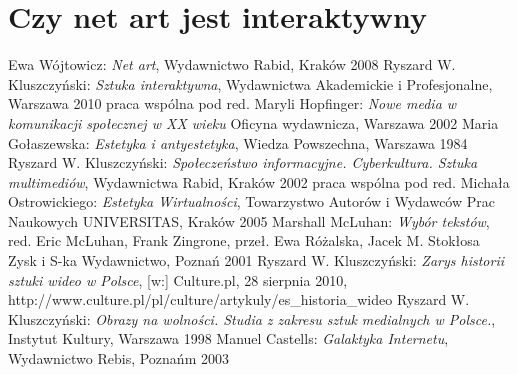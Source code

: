 \documentclass[a4paper,12pt,twoside]{article}
\begin{document}
\section{Czy net art jest interaktywny}


\begin{thebibliography}{6}
  Ewa Wójtowicz:
  \textit{Net art},
  Wydawnictwo Rabid, Kraków 2008
  Ryszard W. Kluszczyński:
  \textit{Sztuka interaktywna},
  Wydawnictwa Akademickie i Profesjonalne,
  Warszawa 2010
  praca wspólna pod red. Maryli Hopfinger:
  \textit{Nowe media w komunikacji społecznej w XX wieku}
  Oficyna wydawnicza,
  Warszawa 2002
  Maria Gołaszewska:
  \textit{Estetyka i antyestetyka},
  Wiedza Powszechna, Warszawa 1984
  Ryszard W. Kluszczyński:
  \textit{Społeczeństwo informacyjne. Cyberkultura. Sztuka multimediów},
  Wydawnictwa Rabid, Kraków 2002
  praca wspólna pod red. Michała Ostrowickiego:
  \textit{Estetyka Wirtualności},
  Towarzystwo Autorów i Wydawców Prac Naukowych UNIVERSITAS,
  Kraków 2005
  Marshall McLuhan:
  \textit{Wybór tekstów},
  red. Eric McLuhan, Frank Zingrone,
  przeł. Ewa Różalska, Jacek M. Stokłosa
  Zysk i S-ka Wydawnictwo, Poznań 2001
  Ryszard W. Kluszczyński:
  \textit{Zarys historii sztuki wideo w Polsce},
  [w:] Culture.pl, 28 sierpnia 2010,
  http://www.culture.pl/pl/culture/artykuly/es\_historia\_wideo
  Ryszard W. Kluszczyński:
  \textit{Obrazy na wolności. Studia z zakresu sztuk medialnych w Polsce.},
  Instytut Kultury, Warszawa 1998
  Manuel Castells:
  \textit{Galaktyka Internetu},
  Wydawnictwo Rebis, Poznańm 2003

\end{thebibliography}
\end{document}
